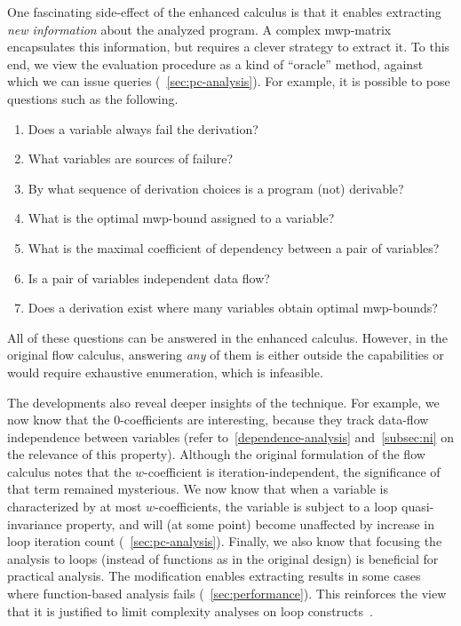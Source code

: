 One fascinating side-effect of the enhanced calculus is that it enables extracting \emph{new information} about the analyzed program.
A complex mwp-matrix encapsulates this information, but requires a clever strategy to extract it.
To this end, we view the evaluation procedure as a kind of \enquote{oracle} method, against which we can issue queries (\cf~\autoref{sec:pc-analysis}).
For example, it is possible to pose questions such as the following.
\begin{enumerate}
\item Does a variable always fail the derivation?
\item What variables are sources of failure?
\item By what sequence of derivation choices is a program (not) derivable?
\item What is the optimal mwp-bound assigned to a variable?
\item What is the maximal coefficient of dependency between a pair of variables?
\item Is a pair of variables independent \wrt data flow?
\item Does a derivation exist where many variables obtain optimal mwp-bounds?
\end{enumerate}
All of these questions can be answered in the enhanced calculus.
However, in the original flow calculus, answering \emph{any} of them is either outside the capabilities or would require exhaustive enumeration, which is infeasible.

The developments also reveal deeper insights of the technique.
For example, we now know that the \(0\)-coefficients are interesting, because they track data-flow independence between variables
(refer to~\autoref{dependence-analysis} and~\autoref{subsec:ni} on the relevance of this property).
Although the original formulation of the flow calculus notes that the \(w\)-coefficient is iteration-independent, the significance of that term remained mysterious.
We now know that when a variable is characterized by at most \(w\)-coefficients, the variable is subject to a loop
quasi-invariance property, and will (at some point) become unaffected by increase in loop iteration count (\cf~\autoref{sec:pc-analysis}).
Finally, we also know that focusing the analysis to loops (instead of functions as in the original design) is beneficial for practical analysis.
The modification enables extracting results in some cases where function-based analysis fails (\cf~\autoref{sec:performance}).
This reinforces the view that it is justified to limit complexity analyses on loop constructs~\cite{benamram2020}.

